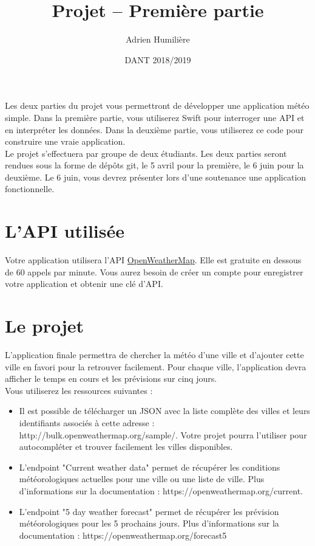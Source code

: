 \documentclass[a4paper,11pt]{scrartcl}
\begin{document}
\newcommand{\mytitle}{\textsf{\textbf{Projet – Première partie}}}
\title{\mytitle}
\author{Adrien Humilière}
\date{DANT 2018/2019}

\maketitle

Les deux parties du projet vous permettront de développer une application météo simple. Dans la première partie, vous utiliserez Swift pour interroger une API et en interpréter les données. Dans la deuxième partie, vous utiliserez ce code pour construire une vraie application.\\

Le projet s'effectuera par groupe de deux étudiants. Les deux parties seront rendues sous la forme de dépôts git, le 5 avril pour la première, le 6 juin pour la deuxième. Le 6 juin, vous devrez présenter lors d'une soutenance une application fonctionnelle.

\section*{L'API utilisée}

Votre application utilisera l'API \href{https://openweathermap.org/api}{OpenWeatherMap}. Elle est gratuite en dessous de 60 appels par minute. Vous aurez besoin de créer un compte pour enregistrer votre application et obtenir une clé d'API. 

\section*{Le projet}

L'application finale permettra de chercher la météo d'une ville et d'ajouter cette ville en favori pour la retrouver facilement. Pour chaque ville, l'application devra afficher le temps en cours et les prévisions sur cinq jours.\\

Vous utiliserez les ressources suivantes :
\begin{itemize}
\item Il est possible de télécharger un JSON avec la liste complète des villes et leurs identifiants associés à cette adresse : http://bulk.openweathermap.org/sample/. Votre projet pourra l'utiliser pour autocompléter et trouver facilement les villes disponibles.
\item L'endpoint "Current weather data" permet de récupérer les conditions météorologiques actuelles pour une ville ou une liste de ville. Plus d'informations sur la documentation : https://openweathermap.org/current.
\item L'endpoint "5 day weather forecast" permet de récupérer les prévision météorologiques pour les 5 prochains jours. Plus d'informations sur la documentation : https://openweathermap.org/forecast5
\end{itemize}
\end{document}
